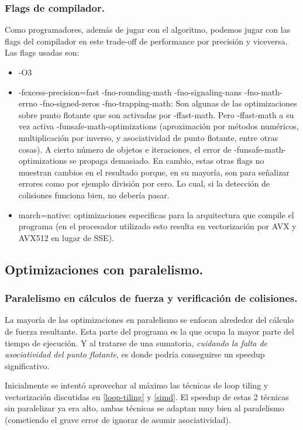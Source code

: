 \documentclass{article}
\begin{document}
\subsubsection{Flags de compilador.\label{compiler}}
Como programadores, además de jugar con el algoritmo, podemos jugar con las flags
del compilador en este trade-off de performance por precisión y viceversa.
Las flags usadas son:
\begin{itemize}
		\item -O3
		\item -fexcess-precision=fast -fno-rounding-math -fno-signaling-nans
			-fno-math-errno -fno-signed-zeros -fno-trapping-math: Son algunas de las optimizaciones
			sobre punto flotante que son activadas por -ffast-math. Pero -ffast-math
			a su vez activa -funsafe-math-optimizations (aproximación por métodos numéricos, multiplicación por inverso, y asociatividad
			de punto flotante, entre otras cosas). A cierto número de objetos e iteraciones, el error
			de -funsafe-math-optimizations se propaga demasiado. En cambio, estas otras flags no muestran cambios en el resultado porque, en su
			mayoría, son para señalizar errores como por ejemplo división por cero. Lo cual, si la detección
			de colisiones funciona bien, no debería pasar.
		\item march=native: optimizaciones especificas para la arquitectura que compile el programa (en el procesador
			utilizado esto resulta en vectorización por AVX y AVX512 en lugar de SSE).
\end{itemize}

\subsection{Optimizaciones con paralelismo.\label{opt_parallel}}
\subsubsection{Paralelismo en cálculos de fuerza y verificación de colisiones.}
La mayoría de las optimizaciones en paralelismo se enfocan alrededor del cálculo de fuerza resultante.
Esta parte del programa es la que ocupa la mayor parte del tiempo de ejecución. Y al tratarse de una sumatoria,
\textit{cuidando la falta de asociatividad del punto flotante}, es donde podría conseguirse un speedup significativo.


Inicialmente se intentó aprovechar al máximo las técnicas de loop tiling y vectorización discutidas
en \ref{loop-tiling} y \ref{simd}. El speedup de estas 2 técnicas sin paralelizar ya era alto, ambas técnicas se adaptan muy bien al paralelismo
(cometiendo el grave error de ignorar de asumir asociatividad).
\end{document}
